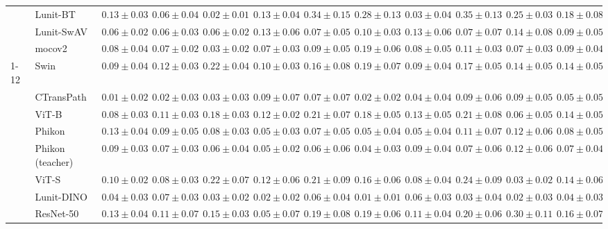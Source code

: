 \begin{tabular}{ll|cccc|c|cccc|c}
 & Lunit-BT & $0.13 \pm 0.03$ & $0.06 \pm 0.04$ & $0.02 \pm 0.01$ & $0.13 \pm 0.04$ & $0.34 \pm 0.15$ & $0.28 \pm 0.13$ & $0.03 \pm 0.04$ & $0.35 \pm 0.13$ & $0.25 \pm 0.03$ & $0.18 \pm 0.08$ \\
 & Lunit-SwAV & $0.06 \pm 0.02$ & $0.06 \pm 0.03$ & $0.06 \pm 0.02$ & $0.13 \pm 0.06$ & $0.07 \pm 0.05$ & $0.10 \pm 0.03$ & $0.13 \pm 0.06$ & $0.07 \pm 0.07$ & $0.14 \pm 0.08$ & $0.09 \pm 0.05$ \\
 & mocov2 & $0.08 \pm 0.04$ & $0.07 \pm 0.02$ & $0.03 \pm 0.02$ & $0.07 \pm 0.03$ & $0.09 \pm 0.05$ & $0.19 \pm 0.06$ & $0.08 \pm 0.05$ & $0.11 \pm 0.03$ & $0.07 \pm 0.03$ & $0.09 \pm 0.04$ \\
\cline{1-12}
\multirow[t]{12}{*}{Transformer} & Swin & $0.09 \pm 0.04$ & $0.12 \pm 0.03$ & $0.22 \pm 0.04$ & $0.10 \pm 0.03$ & $0.16 \pm 0.08$ & $0.19 \pm 0.07$ & $0.09 \pm 0.04$ & $0.17 \pm 0.05$ & $0.14 \pm 0.05$ & $0.14 \pm 0.05$ \\
 & CTransPath & $\mathbf{0.01 \pm 0.02}$ & $\mathbf{0.02 \pm 0.03}$ & $0.03 \pm 0.03$ & $0.09 \pm 0.07$ & $0.07 \pm 0.07$ & $0.02 \pm 0.02$ & $0.04 \pm 0.04$ & $0.09 \pm 0.06$ & $0.09 \pm 0.05$ & $0.05 \pm 0.05$ \\
 & ViT-B & $0.08 \pm 0.03$ & $0.11 \pm 0.03$ & $0.18 \pm 0.03$ & $0.12 \pm 0.02$ & $0.21 \pm 0.07$ & $0.18 \pm 0.05$ & $0.13 \pm 0.05$ & $0.21 \pm 0.08$ & $0.06 \pm 0.05$ & $0.14 \pm 0.05$ \\
 & Phikon & $0.13 \pm 0.04$ & $0.09 \pm 0.05$ & $0.08 \pm 0.03$ & $0.05 \pm 0.03$ & $0.07 \pm 0.05$ & $0.05 \pm 0.04$ & $0.05 \pm 0.04$ & $0.11 \pm 0.07$ & $0.12 \pm 0.06$ & $0.08 \pm 0.05$ \\
 & Phikon (teacher) & $0.09 \pm 0.03$ & $0.07 \pm 0.03$ & $0.06 \pm 0.04$ & $0.05 \pm 0.02$ & $0.06 \pm 0.06$ & $0.04 \pm 0.03$ & $0.09 \pm 0.04$ & $0.07 \pm 0.06$ & $0.12 \pm 0.06$ & $0.07 \pm 0.04$ \\
 & ViT-S & $0.10 \pm 0.02$ & $0.08 \pm 0.03$ & $0.22 \pm 0.07$ & $0.12 \pm 0.06$ & $0.21 \pm 0.09$ & $0.16 \pm 0.06$ & $0.08 \pm 0.04$ & $0.24 \pm 0.09$ & $0.03 \pm 0.02$ & $0.14 \pm 0.06$ \\
 & Lunit-DINO & $0.04 \pm 0.03$ & $0.07 \pm 0.03$ & $0.03 \pm 0.02$ & $\mathbf{0.02 \pm 0.02}$ & $\mathbf{0.06 \pm 0.04}$ & $\mathbf{0.01 \pm 0.01}$ & $0.06 \pm 0.03$ & $\mathbf{0.03 \pm 0.04}$ & $\mathbf{0.02 \pm 0.03}$ & $\mathbf{0.04 \pm 0.03}$ \\
 & ResNet-50 & $0.13 \pm 0.04$ & $0.11 \pm 0.07$ & $0.15 \pm 0.03$ & $0.05 \pm 0.07$ & $0.19 \pm 0.08$ & $0.19 \pm 0.06$ & $0.11 \pm 0.04$ & $0.20 \pm 0.06$ & $0.30 \pm 0.11$ & $0.16 \pm 0.07$ \\

\end{tabular}
